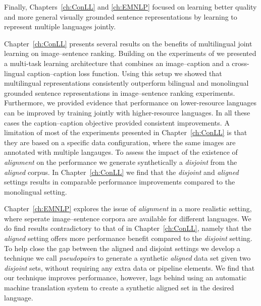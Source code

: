 Finally,  Chapters~\ref{ch:ConLL} and \ref{ch:EMNLP} focused on learning better quality and more general 
visually grounded sentence representations by learning to represent multiple languages jointly. 

Chapter~\ref{ch:ConLL} presents several results on the benefits of multilingual joint learning on image--sentence
ranking. Building on the experiments of \cite{gella2017image} we presented a multi-task learning architecture that 
combines an image--caption and a cross-lingual caption--caption  loss function. Using this setup we showed that
multilingual representations consistently outperform bilingual and monolingual grounded sentence representations
in image--sentence ranking experiments. Furthermore, we provided evidence that performance on lower-resource 
languages can be improved by training jointly with higher-resource languages. In all these cases the caption--caption
objective provided consistent improvements.												
A limitation of most of the experiments presented in Chapter~\ref{ch:ConLL} is that they are based on a 
specific data configuration, where the same images are annotated with multiple langauges. To assess
the impact of the existence of \emph{alignment} on the performance we generate synthetically a \emph{disjoint}
from the \emph{aligned} corpus. In Chapter~\ref{ch:ConLL} we find that the \emph{disjoint} and \emph{aligned}
settings results in comparable performance improvements compared to the monolingual setting.

Chapter~\ref{ch:EMNLP} explores the issue of \emph{alignment} in a more realistic setting, where
seperate image--sentence corpora are available for different languages. 
We do find results contradictory to that of in Chapter~\ref{ch:ConLL}, namely that the \emph{aligned}
setting offers more performance benefit compared to the \emph{disjoint} setting. 
To help close the gap between the aligned and disjoint settings we develop a technique we call \emph{pseudopairs} 
to generate a synthetic \emph{aligned} data set given two \emph{disjoint} sets, without requiring any extra
data or pipeline elements. We find that our technique improves performance, however, lags behind using
an automatic machine translation system to create a synthetic aligned set in the desired language.

